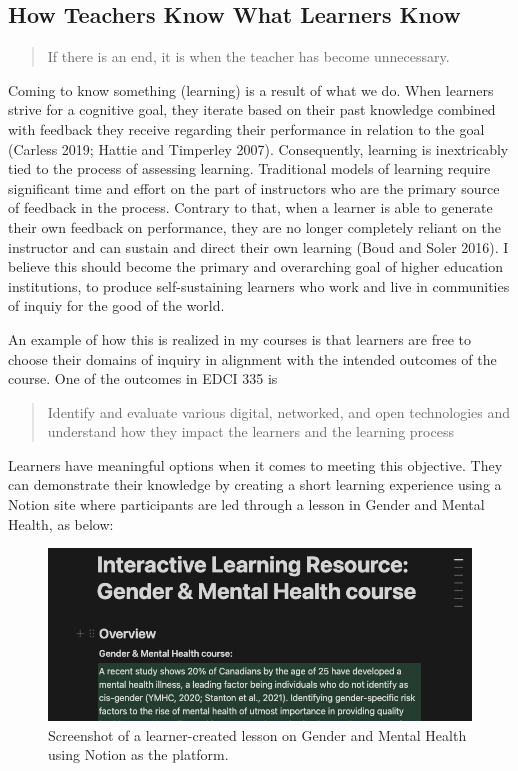\documentclass[
  letterpaper,
  DIV=11,
  numbers=noendperiod]{scrartcl}
\begin{document}
\subsection{How Teachers Know What Learners
Know}\label{how-teachers-know-what-learners-know}

\begin{quote}
If there is an end, it is when the teacher has become unnecessary.
\end{quote}

Coming to know something (learning) is a result of what we do. When
learners strive for a cognitive goal, they iterate based on their past
knowledge combined with feedback they receive regarding their
performance in relation to the goal (Carless 2019; Hattie and Timperley
2007). Consequently, learning is inextricably tied to the process of
assessing learning. Traditional models of learning require significant
time and effort on the part of instructors who are the primary source of
feedback in the process. Contrary to that, when a learner is able to
generate their own feedback on performance, they are no longer
completely reliant on the instructor and can sustain and direct their
own learning (Boud and Soler 2016). I believe this should become the
primary and overarching goal of higher education institutions, to
produce self-sustaining learners who work and live in communities of
inquiy for the good of the world.

An example of how this is realized in my courses is that learners are
free to choose their domains of inquiry in alignment with the intended
outcomes of the course. One of the outcomes in EDCI 335 is

\begin{quote}
Identify and evaluate various digital, networked, and open technologies
and understand how they impact the learners and the learning process
\end{quote}

Learners have meaningful options when it comes to meeting this
objective. They can demonstrate their knowledge by creating a short
learning experience using a Notion site where participants are led
through a lesson in Gender and Mental Health, as below:

\begin{figure}[H]

{\centering \includegraphics{assets/ilr-notion.png}

}

\caption{Screenshot of a learner-created lesson on Gender and Mental
Health using Notion as the platform.}

\end{figure}%
\end{document}
